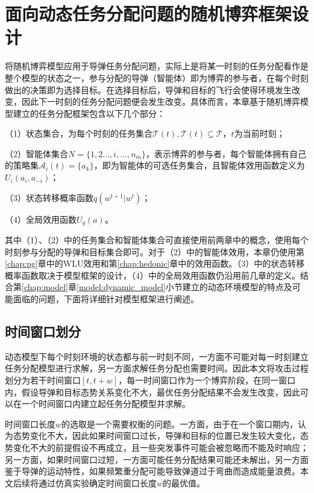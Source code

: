 \section{面向动态任务分配问题的随机博弈框架设计}
\label{sg:framework}

将随机博弈模型应用于导弹任务分配问题，实际上是将某一时刻的任务分配看作是整个模型的状态之一，参与分配的导弹（智能体）即为博弈的参与者，在每个时刻做出的决策即为选择目标。在选择目标后，导弹和目标的飞行会使得环境发生改变，因此下一时刻的任务分配问题便会发生改变。具体而言，本章基于随机博弈模型建立的任务分配框架包含以下几个部分：

（1）状态集合，为每个时刻的任务集合$\mathcal{T}(t), \mathcal{T}(t) \subseteq \mathcal{T}$，$t$为当前时刻；

（2）智能体集合$N=\{1,2\dots,i,\dots,n_m\}$，表示博弈的参与者，每个智能体拥有自己的策略集$\mathcal{A}_i(t) = \{a_k\}$，即为智能体的可选任务集合，且智能体效用函数定义为$U_i(a_i,a_{-i})$；

（3）状态转移概率函数$q(w^{t+1}|w^t)$；

（4）全局效用函数$U_g(a)$。

其中（1）、（2）中的任务集合和智能体集合可直接使用前两章中的概念，使用每个时刻参与分配的导弹和目标集合即可。对于（2）中的智能体效用，本章仍使用第\ref{chap:pg}章中的WLU效用和第\ref{chap:hedonic}章中的效用函数。（3）中的状态转移概率函数取决于模型框架的设计，（4）中的全局效用函数仍沿用前几章的定义。结合第\ref{chap:model}章\ref{model:dynamic_model}小节建立的动态环境模型的特点及可能面临的问题，下面将详细针对模型框架进行阐述。


\subsection{时间窗口划分}
\label{game_stage:time_window}

动态模型下每个时刻环境的状态都与前一时刻不同，一方面不可能对每一时刻建立任务分配模型进行求解，另一方面求解任务分配也需要时间。因此本文将攻击过程划分为若干时间窗口$[t,t+w]$，每一时间窗口作为一个博弈阶段，在同一窗口内，假设导弹和目标态势关系变化不大，最优任务分配结果不会发生改变，因此可以在一个时间窗口内建立起任务分配模型并求解。

时间窗口长度$w$的选取是一个需要权衡的问题。一方面，由于在一个窗口期内，认为态势变化不大，因此如果时间窗口过长，导弹和目标的位置已发生较大变化，态势变化不大的前提假设不再成立，且一些突发事件可能会被忽略而不能及时响应；另一方面，如果时间窗口过短，一方面可能任务分配结果可能还未解出，另一方面鉴于导弹的运动特性，如果频繁重分配可能导致弹道过于弯曲而造成能量浪费。本文后续将通过仿真实验确定时间窗口长度$w$的最优值。

